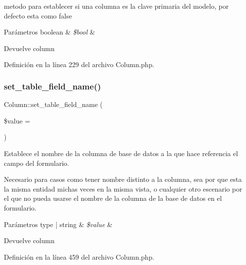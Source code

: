metodo para establecer si una columna es la clave primaria del modelo, por defecto esta como false


\begin{DoxyParams}[1]{Parámetros}
boolean & {\em \$bool} & \\
\hline
\end{DoxyParams}
\begin{DoxyReturn}{Devuelve}
column 
\end{DoxyReturn}


Definición en la línea 229 del archivo Column.\+php.

\mbox{\label{class_column_a314eeaf954a8c2607626f9c742a9f579}} 
\subsubsection{\texorpdfstring{set\_table\_field\_name()}{set\_table\_field\_name()}}
{\footnotesize\ttfamily Column\+::set\+\_\+table\+\_\+field\+\_\+name (\begin{DoxyParamCaption}\item[{}]{\$value = {\ttfamily \textquotesingle{}\textquotesingle{}} }\end{DoxyParamCaption})}

Establece el nombre de la columna de base de datos a la que hace referencia el campo del formulario.

Necesario para casos como tener nombre distinto a la columna, sea por que esta la misma entidad michas veces en la misma vista, o cualquier otro escenario por el que no pueda usarse el nombre de la columna de la base de datos en el formulario.


\begin{DoxyParams}[1]{Parámetros}
type | string & {\em \$value} & \\
\hline
\end{DoxyParams}
\begin{DoxyReturn}{Devuelve}
column 
\end{DoxyReturn}


Definición en la línea 459 del archivo Column.\+php.

\mbox{\label{class_column_a7500d02a0114cde3ddb200143d39a2a0}} 
